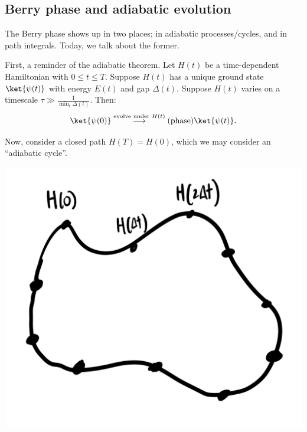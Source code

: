 \subsection{Berry phase and adiabatic evolution}
The Berry phase shows up in two places; in adiabatic processes/cycles, and in path integrals. Today, we talk about the former.

First, a reminder of the adiabatic theorem. Let $H(t)$ be a time-dependent Hamiltonian with $0 \leq t \leq T$. Suppose $H(t)$ has a unique ground state $\ket{\psi(t)}$ with energy $E(t)$ and gap $\Delta(t)$. Suppose $H(t)$ varies on a timescale $\tau \gg \frac{1}{\min_t \Delta (t)}$. Then:
\begin{equation}
    \ket{\psi(0)} \stackrel{\text{evolve under } H(t)}{\longrightarrow} (\text{phase})\ket{\psi(t)}.
\end{equation}

Now, consider a closed path $H(T) = H(0)$, which we may consider an ``adiabatic cycle''. 

\begin{center}
    \includegraphics[scale=0.3]{Lectures/Images/lec3-Hpath.png}
\end{center}

